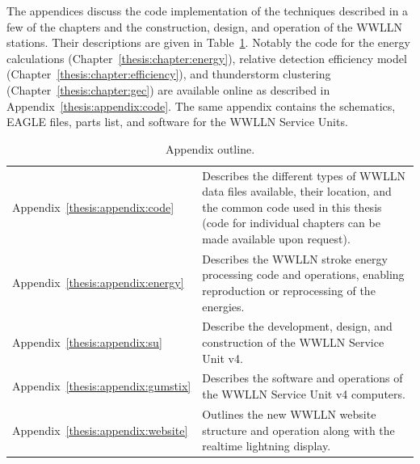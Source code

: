 The appendices discuss the code implementation of the techniques described in a few of the chapters and the construction, design, and operation of the WWLLN stations.
Their descriptions are given in Table~\ref{intro:table:outline_appendix}.
Notably the code for the energy calculations (Chapter~\ref{thesis:chapter:energy}), relative detection efficiency model (Chapter~\ref{thesis:chapter:efficiency}), and thunderstorm clustering (Chapter~\ref{thesis:chapter:gec}) are available online as described in Appendix~\ref{thesis:appendix:code}.  The same appendix contains the schematics, EAGLE files, parts list, and software for the WWLLN Service Units.

\begin{table}[ht!]
\caption{Appendix outline.}
\label{intro:table:outline_appendix}
\begin{center}
\begin{tabular}{l p{5in}}

\rule{0pt}{3ex}
Appendix~\ref{thesis:appendix:code}	&
Describes the different types of WWLLN data files available, their location, and the common code used in this thesis (code for individual chapters can be made available upon request).
\\ 

\rule{0pt}{3ex}
Appendix~\ref{thesis:appendix:energy} &
Describes the WWLLN stroke energy processing code and operations, enabling reproduction or reprocessing of the energies.
\\ 

\rule{0pt}{3ex}
Appendix~\ref{thesis:appendix:su}	&
Describe the development, design, and construction of the WWLLN Service Unit v4.
\\  

\rule{0pt}{3ex}
Appendix~\ref{thesis:appendix:gumstix}	&
Describes the software and operations of the WWLLN Service Unit v4 computers.
\\ 

\rule{0pt}{3ex}
Appendix~\ref{thesis:appendix:website}	&
Outlines the new WWLLN website structure and operation along with the realtime lightning display.
\\ 

\end{tabular}
\end{center}
\end{table}
